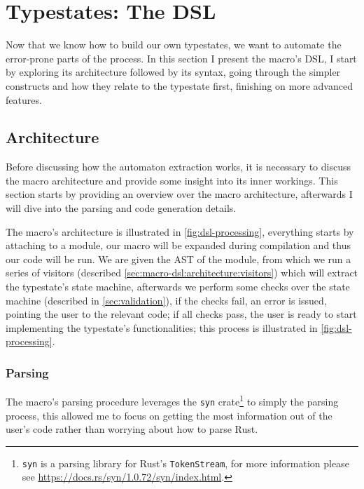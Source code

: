 \section{Typestates: The DSL}\label{sec:macro-dsl}

Now that we know how to build our own typestates,
we want to automate the error-prone parts of the process.
In this section I present the macro's DSL,
I start by exploring its architecture followed by its syntax,
going through the simpler constructs and how they relate to the typestate first,
finishing on more advanced features.

\subsection{Architecture}\label{sec:macro-dsl:architecture}

Before discussing how the automaton extraction works, it is necessary to discuss the macro architecture and
provide some insight into its inner workings.
This section starts by providing an overview over the macro architecture,
afterwards I will dive into the parsing and code generation details.

The macro's architecture is illustrated in \autoref{fig:dsl-processing},
everything starts by attaching  to a module,
our macro will be expanded during compilation and thus our code will be run.
We are given the \gls{AST} of the module, from which we run a series of visitors
(described \autoref{sec:macro-dsl:architecture:visitors}) which will extract the typestate's state machine,
afterwards we perform some checks over the state machine (described in \autoref{sec:validation}),
if the checks fail, an error is issued, pointing the user to the relevant code;
if all checks pass, the user is ready to start implementing the typestate's functionalities;
this process is illustrated in \autoref{fig:dsl-processing}.



\subsubsection{Parsing}

The macro's parsing procedure leverages the \texttt{syn} crate\footnote{\texttt{syn} is a parsing library for Rust's \texttt{TokenStream},
for more information please see \url{https://docs.rs/syn/1.0.72/syn/index.html}.} to simply the parsing process,
this allowed me to focus on getting the most information out of the user's code rather than worrying about how to parse Rust.

